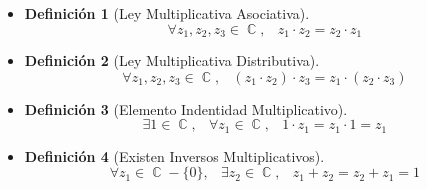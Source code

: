 \documentclass[12pt, fleqn]{report}                             %
\DeclareMathOperator \Space {\quad}                             %
\DeclareMathOperator \MiniSpace {\;}                            %
\newtheorem{Definition}{Definición}[section]                    %
\DeclareMathOperator \Complexs  {\mathbb{C}}                     %
\begin{document}
\begin{itemize}
                \item 
                    \begin{Definition}[Ley Multiplicativa Asociativa]
                        \begin{equation}
                            \forall z_1, z_2, z_3 \in \Complexs, \MiniSpace
                                z_1  \cdot z_2 = z_2 \cdot z_1
                        \end{equation}
                    \end{Definition}

                \item 
                    \begin{Definition}[Ley Multiplicativa Distributiva]
                        \begin{equation}
                            \forall z_1, z_2, z_3 \in \Complexs, \MiniSpace
                                (z_1  \cdot z_2)  \cdot z_3 = z_1  \cdot (z_2  \cdot z_3)
                        \end{equation}
                    \end{Definition}

                \item
                    \begin{Definition}[Elemento Indentidad Multiplicativo]
                        \begin{equation}
                            \exists 1 \in \Complexs, \MiniSpace
                                \forall z_1 \in \Complexs, \MiniSpace 1 \cdot z_1 = z_1  \cdot 1 = z_1
                        \end{equation}
                    \end{Definition}

                \item
                    \begin{Definition}[Existen Inversos Multiplicativos]
                        \begin{equation}
                            \forall z_1 \in \Complexs - \{0\}, \MiniSpace
                                \exists z_2 \in \Complexs, \MiniSpace
                                    z_1  + z_2= z_2 + z_1 = 1
                        \end{equation}
                    \end{Definition}

                \end{itemize}
\end{document}
